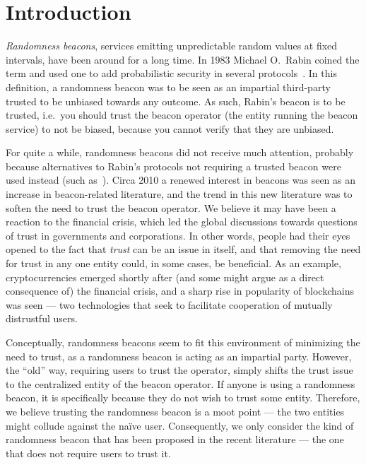 \section{Introduction}

\emph{Randomness beacons}, services emitting unpredictable random values at fixed intervals, have been around for a long time.
In 1983 Michael O.\ Rabin coined the term and used one to add probabilistic security in several protocols~\cite{rabin1983transaction}.
In this definition, a randomness beacon was to be seen as an impartial third-party trusted to be unbiased towards any outcome.
As such, Rabin's beacon is to be trusted, i.e.\ you should trust the beacon operator (the entity running the beacon service) to not be biased, because you cannot verify that they are unbiased.

For quite a while, randomness beacons did not receive much attention, probably because alternatives to Rabin's protocols not requiring a trusted beacon were used instead (such as~\cite{BGMR}).
Circa 2010 a renewed interest in beacons was seen as an increase in beacon-related literature, and the trend in this new literature was to soften the need to trust the beacon operator.
We believe it may have been a reaction to the financial crisis, which led the global discussions towards questions of trust in governments and corporations.
In other words, people had their eyes opened to the fact that \emph{trust} can be an issue in itself, and that removing the need for trust in any one entity could, in some cases, be beneficial.
As an example, cryptocurrencies emerged shortly after (and some might argue as a direct consequence of) the financial crisis, and a sharp rise in popularity of blockchains was seen --- two technologies that seek to facilitate cooperation of mutually distrustful users.

Conceptually, randomness beacons seem to fit this environment of minimizing the need to trust, as a randomness beacon is acting as an impartial party.
However, the \enquote{old} way, requiring users to trust the operator, simply shifts the trust issue to the centralized entity of the beacon operator.
If anyone is using a randomness beacon, it is specifically because they do not wish to trust some entity.
Therefore, we believe trusting the randomness beacon is a moot point --- the two entities might collude against the naïve user.
Consequently, we only consider the kind of randomness beacon that has been proposed in the recent literature --- the one that does not require users to trust it.

